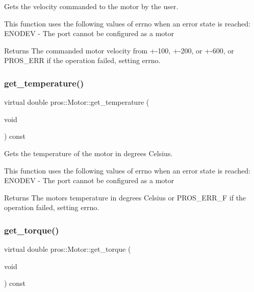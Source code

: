 Gets the velocity commanded to the motor by the user. 

This function uses the following values of errno when an error state is reached\+: E\+N\+O\+D\+EV -\/ The port cannot be configured as a motor

\begin{DoxyReturn}{Returns}
The commanded motor velocity from +-\/100, +-\/200, or +-\/600, or P\+R\+O\+S\+\_\+\+E\+RR if the operation failed, setting errno. 
\end{DoxyReturn}
\mbox{\label{classpros_1_1Motor_a9fd793251b91c2ac0091c65f290f740d}} 
\subsubsection{\texorpdfstring{get\+\_\+temperature()}{get\_temperature()}}
{\footnotesize\ttfamily virtual double pros\+::\+Motor\+::get\+\_\+temperature (\begin{DoxyParamCaption}\item[{void}]{ }\end{DoxyParamCaption}) const\hspace{0.3cm}{\ttfamily [virtual]}}



Gets the temperature of the motor in degrees Celsius. 

This function uses the following values of errno when an error state is reached\+: E\+N\+O\+D\+EV -\/ The port cannot be configured as a motor

\begin{DoxyReturn}{Returns}
The motor\textquotesingle{}s temperature in degrees Celsius or P\+R\+O\+S\+\_\+\+E\+R\+R\+\_\+F if the operation failed, setting errno. 
\end{DoxyReturn}
\mbox{\label{classpros_1_1Motor_a14e0c57c0ca7bde15f73414abf4c3c8e}} 
\subsubsection{\texorpdfstring{get\+\_\+torque()}{get\_torque()}}
{\footnotesize\ttfamily virtual double pros\+::\+Motor\+::get\+\_\+torque (\begin{DoxyParamCaption}\item[{void}]{ }\end{DoxyParamCaption}) const\hspace{0.3cm}{\ttfamily [virtual]}}



